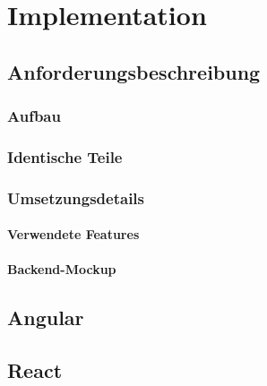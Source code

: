 \chapter{Implementation}

\section{Anforderungsbeschreibung}

\subsection{Aufbau}
\subsection{Identische Teile}
\subsection{Umsetzungsdetails}
\subsubsection{Verwendete Features}
\subsubsection{Backend-Mockup}

\section{Angular}
\section{React}